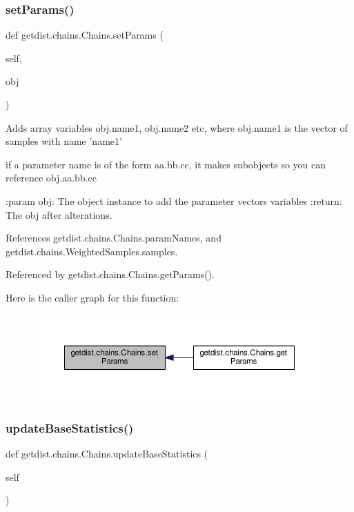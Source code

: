 \subsubsection{\texorpdfstring{set\+Params()}{setParams()}}
{\footnotesize\ttfamily def getdist.\+chains.\+Chains.\+set\+Params (\begin{DoxyParamCaption}\item[{}]{self,  }\item[{}]{obj }\end{DoxyParamCaption})}

\begin{DoxyVerb}Adds array variables obj.name1, obj.name2 etc, where
obj.name1 is the vector of samples with name 'name1'

if a parameter name is of the form aa.bb.cc, it makes subobjects so you can reference obj.aa.bb.cc

:param obj: The object instance to add the parameter vectors variables
:return: The obj after alterations.
\end{DoxyVerb}
 

References getdist.\+chains.\+Chains.\+param\+Names, and getdist.\+chains.\+Weighted\+Samples.\+samples.



Referenced by getdist.\+chains.\+Chains.\+get\+Params().

Here is the caller graph for this function\+:
\nopagebreak
\begin{figure}[H]
\begin{center}
\leavevmode
\includegraphics[width=350pt]{classgetdist_1_1chains_1_1Chains_aa2e6d26b972941cdab11c8d7088fa466_icgraph}
\end{center}
\end{figure}
\mbox{\label{classgetdist_1_1chains_1_1Chains_a2707ea98f828744379464c54a693d906}} 
\subsubsection{\texorpdfstring{update\+Base\+Statistics()}{updateBaseStatistics()}}
{\footnotesize\ttfamily def getdist.\+chains.\+Chains.\+update\+Base\+Statistics (\begin{DoxyParamCaption}\item[{}]{self }\end{DoxyParamCaption})}

